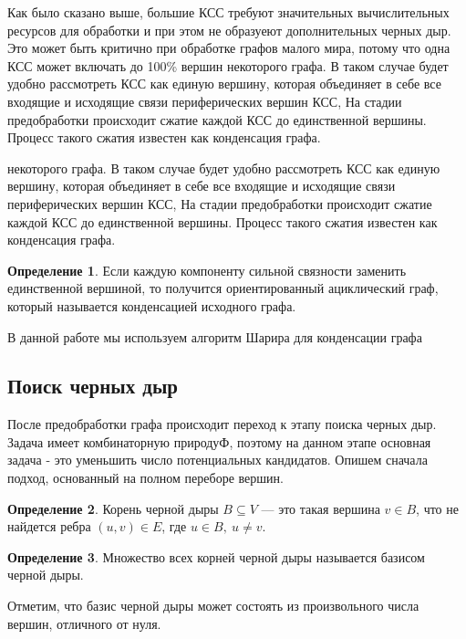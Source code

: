 \documentclass[12pt,a4paper,oneside]{article}
\theoremstyle{definition}
\newtheorem{definition}{Определение}[]
\theoremstyle{lemma}
\theoremstyle{remark}
\begin{document}
Как было сказано выше, большие КСС требуют значительных вычислительных ресурсов для обработки и при этом не образуеют дополнительных черных дыр. Это может быть критично при обработке графов малого мира, потому что одна КСС может включать до 100\% вершин некоторого графа. В таком случае будет удобно рассмотреть КСС как единую вершину, которая объединяет в себе все входящие и исходящие связи периферических вершин КСС, На стадии предобработки происходит сжатие каждой КСС до единственной вершины. Процесс такого сжатия известен как конденсация графа.

 некоторого графа. В таком случае будет удобно рассмотреть КСС как единую вершину, которая объединяет в себе все входящие и исходящие связи периферических вершин КСС, На стадии предобработки происходит сжатие каждой КСС до единственной вершины. Процесс такого сжатия известен как конденсация графа.

\begin{definition}\label{def:condensation}
Если каждую компоненту сильной связности заменить единственной вершиной, то получится ориентированный ациклический граф, который называется конденсацией исходного графа.
\end{definition}

В данной работе мы используем алгоритм Шарира для конденсации графа \cite{sharir1981strong}

\subsection{Поиск черных дыр}

После предобработки графа происходит переход к этапу поиска черных дыр. Задача имеет комбинаторную природуФ, поэтому на данном этапе основная задача - это уменьшить число потенциальных кандидатов. Опишем сначала подход, основанный на полном переборе вершин.


\begin{definition}\label{def:blackholeroot}
Корень черной дыры $B \subseteq V$ --- это такая вершина $v \in B$, что не найдется ребра $(u, v) \in E$, где $u \in B,\ u \neq v$.
\end{definition}

\begin{definition}\label{def:blackholebasis}
Множество всех корней черной дыры называется базисом черной дыры.
\end{definition}

Отметим, что базис черной дыры может состоять из произвольного числа вершин, отличного от нуля.
\end{document}
